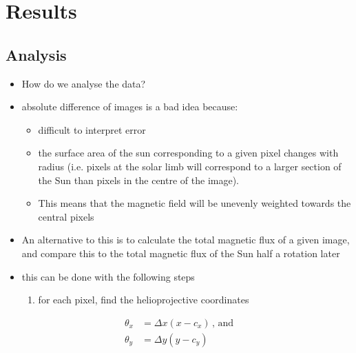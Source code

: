 \documentclass[11pt,a4paper,onecolumn]{report}
\begin{document}
%
%
%
%
%
%
%
%
\chapter{Results}
%
%
%
%
%
%
%
%







%
%
%
%
%
%
%
\section{Analysis}
%
%
%
%
%
%


\begin{itemize}
  \item How do we analyse the data?
  \item absolute difference of images is a bad idea because:
  \begin{itemize}
    \item difficult to interpret error
    \item the surface area of the sun corresponding to a given pixel changes
    with radius (i.e. pixels at the solar limb will correspond to a larger
    section of the Sun than pixels in the centre of the image).
    \item This means that the magnetic field will be unevenly weighted towards
    the central pixels
  \end{itemize}
  \item An alternative to this is to calculate the total magnetic flux of a
  given image, and compare this to the total magnetic flux of the Sun half a
  rotation later
  \item this can be done with the following steps
  \begin{enumerate}
    \item for each pixel, find the helioprojective coordinates
  \end{enumerate}
\end{itemize}

\begin{align}
  \theta_x &= \Delta x (x - c_x) \, \text{, and} \\
  \theta_y &= \Delta y (y - c_y)
\end{align}
\end{document}
